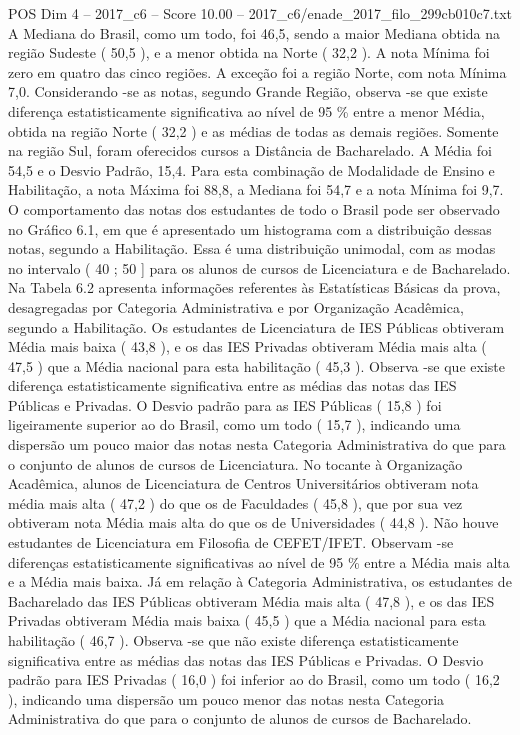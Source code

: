 \begin{textsample}{POS Dim 4 – 2017\_c6 – Score 10.00 – 2017\_c6/enade\_2017\_filo\_299cb010c7.txt}
A Mediana do Brasil, como um todo, foi 46,5, sendo a maior Mediana obtida na região Sudeste ( 50,5 ), e a menor obtida na Norte ( 32,2 ).
A nota Mínima foi zero em quatro das cinco regiões.
A exceção foi a região Norte, com nota Mínima 7,0.
Considerando -se as notas, segundo Grande Região, observa -se que existe diferença estatisticamente significativa ao nível de 95 \% entre a menor Média, obtida na região Norte ( 32,2 ) e as médias de todas as demais regiões.
Somente na região Sul, foram oferecidos cursos a Distância de Bacharelado.
A Média foi 54,5 e o Desvio Padrão, 15,4.
Para esta combinação de Modalidade de Ensino e Habilitação, a nota Máxima foi 88,8, a Mediana foi 54,7 e a nota Mínima foi 9,7.
O comportamento das notas dos estudantes de todo o Brasil pode ser observado no Gráfico 6.1, em que é apresentado um histograma com a distribuição dessas notas, segundo a Habilitação.
Essa é uma distribuição unimodal, com as modas no intervalo ( 40 ; 50 ] para os alunos de cursos de Licenciatura e de Bacharelado.
Na Tabela 6.2 apresenta informações referentes às Estatísticas Básicas da prova, desagregadas por Categoria Administrativa e por Organização Acadêmica, segundo a Habilitação.
Os estudantes de Licenciatura de IES Públicas obtiveram Média mais baixa ( 43,8 ), e os das IES Privadas obtiveram Média mais alta ( 47,5 ) que a Média nacional para esta habilitação ( 45,3 ).
Observa -se que existe diferença estatisticamente significativa entre as médias das notas das IES Públicas e Privadas.
O Desvio padrão para as IES Públicas ( 15,8 ) foi ligeiramente superior ao do Brasil, como um todo ( 15,7 ), indicando uma dispersão um pouco maior das notas nesta Categoria Administrativa do que para o conjunto de alunos de cursos de Licenciatura.
No tocante à Organização Acadêmica, alunos de Licenciatura de Centros Universitários obtiveram nota média mais alta ( 47,2 ) do que os de Faculdades ( 45,8 ), que por sua vez obtiveram nota Média mais alta do que os de Universidades ( 44,8 ).
Não houve estudantes de Licenciatura em Filosofia de CEFET/IFET.
Observam -se diferenças estatisticamente significativas ao nível de 95 \% entre a Média mais alta e a Média mais baixa.
Já em relação à Categoria Administrativa, os estudantes de Bacharelado das IES Públicas obtiveram Média mais alta ( 47,8 ), e os das IES Privadas obtiveram Média mais baixa ( 45,5 ) que a Média nacional para esta habilitação ( 46,7 ).
Observa -se que não existe diferença estatisticamente significativa entre as médias das notas das IES Públicas e Privadas.
O Desvio padrão para IES Privadas ( 16,0 ) foi inferior ao do Brasil, como um todo ( 16,2 ), indicando uma dispersão um pouco menor das notas nesta Categoria Administrativa do que para o conjunto de alunos de cursos de Bacharelado.

\end{textsample}
